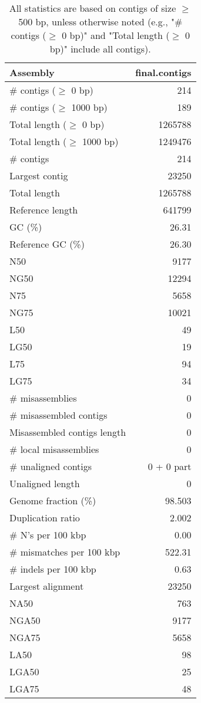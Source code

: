 \documentclass[12pt,a4paper]{article}
\begin{document}
\begin{table}[ht]
\begin{center}
\caption{All statistics are based on contigs of size $\geq$ 500 bp, unless otherwise noted (e.g., "\# contigs ($\geq$ 0 bp)" and "Total length ($\geq$ 0 bp)" include all contigs).}
\begin{tabular}{|l*{1}{|r}|}
\hline
Assembly & final.contigs \\ \hline
\# contigs ($\geq$ 0 bp) & 214 \\ \hline
\# contigs ($\geq$ 1000 bp) & 189 \\ \hline
Total length ($\geq$ 0 bp) & 1265788 \\ \hline
Total length ($\geq$ 1000 bp) & 1249476 \\ \hline
\# contigs & 214 \\ \hline
Largest contig & 23250 \\ \hline
Total length & 1265788 \\ \hline
Reference length & 641799 \\ \hline
GC (\%) & 26.31 \\ \hline
Reference GC (\%) & 26.30 \\ \hline
N50 & 9177 \\ \hline
NG50 & 12294 \\ \hline
N75 & 5658 \\ \hline
NG75 & 10021 \\ \hline
L50 & 49 \\ \hline
LG50 & 19 \\ \hline
L75 & 94 \\ \hline
LG75 & 34 \\ \hline
\# misassemblies & 0 \\ \hline
\# misassembled contigs & 0 \\ \hline
Misassembled contigs length & 0 \\ \hline
\# local misassemblies & 0 \\ \hline
\# unaligned contigs & 0 + 0 part \\ \hline
Unaligned length & 0 \\ \hline
Genome fraction (\%) & 98.503 \\ \hline
Duplication ratio & 2.002 \\ \hline
\# N's per 100 kbp & 0.00 \\ \hline
\# mismatches per 100 kbp & 522.31 \\ \hline
\# indels per 100 kbp & 0.63 \\ \hline
Largest alignment & 23250 \\ \hline
NA50 & 763 \\ \hline
NGA50 & 9177 \\ \hline
NGA75 & 5658 \\ \hline
LA50 & 98 \\ \hline
LGA50 & 25 \\ \hline
LGA75 & 48 \\ \hline
\end{tabular}
\end{center}
\end{table}
\end{document}
